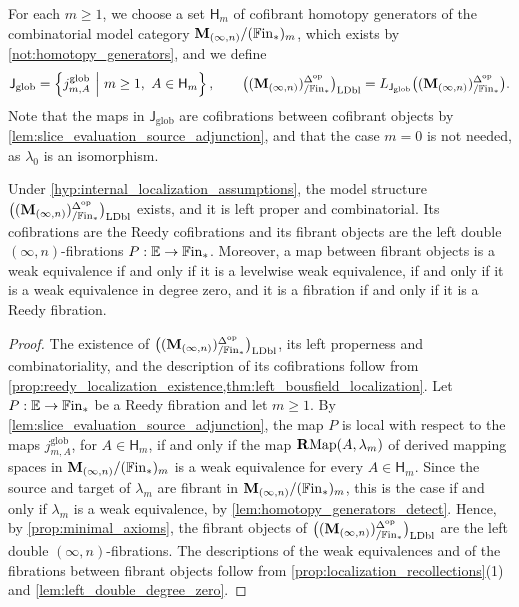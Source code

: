 \documentclass[10pt,reqno]{amsart}
\begin{document}
For each $m\geq1$, we choose a set $\mathsf H_m$ of cofibrant
homotopy generators of the combinatorial model category
$\mathbf M_{(\infty,n)}/(\mathbb{F}\mathrm{in}_*)_m$, which exists by
\cref{not:homotopy_generators}, and we define
\begin{equation}
\label{eq:general_source_localizers}
\mathsf J_{\mathrm{glob}}=
\left\{j^{\mathrm{glob}}_{m,A}\ \middle|\
 m\geq1,\ A\in\mathsf H_m\right\},
\qquad
\bigl((\mathbf M_{(\infty,n)})^{\Delta^{\mathrm{op}}}_{/\mathbb{F}\mathrm{in}_*}\bigr)_{\mathrm{LDbl}}=
L_{\mathsf J_{\mathrm{glob}}}
\bigl((\mathbf M_{(\infty,n)})^{\Delta^{\mathrm{op}}}_{/\mathbb{F}\mathrm{in}_*}\bigr).
\end{equation}
Note that the maps in $\mathsf J_{\mathrm{glob}}$ are cofibrations
between cofibrant objects by
\cref{lem:slice_evaluation_source_adjunction}, and that the case
$m=0$ is not needed, as $\lambda_0$ is an isomorphism.

\begin{theorem}
\label{thm:general_left_double_model_structure}
Under \cref{hyp:internal_localization_assumptions}, the model
structure $\bigl((\mathbf M_{(\infty,n)})^{\Delta^{\mathrm{op}}}_{/\mathbb{F}\mathrm{in}_*}\bigr)_{\mathrm{LDbl}}$ exists, and it is left proper and
combinatorial. Its cofibrations are the Reedy cofibrations and its
fibrant objects are the left double $(\infty,n)$-fibrations
$P:\mathbb E\to\mathbb{F}\mathrm{in}_*$. Moreover, a map between fibrant objects
is a weak equivalence if and only if it is a levelwise weak
equivalence, if and only if it is a weak equivalence in degree zero,
and it is a fibration if and only if it is a Reedy fibration.
\end{theorem}

\begin{proof}
The existence of $\bigl((\mathbf M_{(\infty,n)})^{\Delta^{\mathrm{op}}}_{/\mathbb{F}\mathrm{in}_*}\bigr)_{\mathrm{LDbl}}$, its left properness and
combinatoriality, and the description of its cofibrations follow from
\cref{prop:reedy_localization_existence,thm:left_bousfield_localization}.
Let $P:\mathbb E\to\mathbb{F}\mathrm{in}_*$ be a Reedy fibration and let
$m\geq1$. By \cref{lem:slice_evaluation_source_adjunction}, the map
$P$ is local with respect to the maps $j^{\mathrm{glob}}_{m,A}$,
for $A\in\mathsf H_m$, if and only if the map
$\mathbf{R}\mathrm{Map}(A,\lambda_m)$ of derived mapping spaces in
$\mathbf M_{(\infty,n)}/(\mathbb{F}\mathrm{in}_*)_m$ is a weak equivalence for every
$A\in\mathsf H_m$. Since the source and target of $\lambda_m$ are
fibrant in $\mathbf M_{(\infty,n)}/(\mathbb{F}\mathrm{in}_*)_m$, this is the case if and only if
$\lambda_m$ is a weak equivalence, by
\cref{lem:homotopy_generators_detect}. Hence, by
\cref{prop:minimal_axioms}, the fibrant objects of $\bigl((\mathbf M_{(\infty,n)})^{\Delta^{\mathrm{op}}}_{/\mathbb{F}\mathrm{in}_*}\bigr)_{\mathrm{LDbl}}$ are
the left double $(\infty,n)$-fibrations. The descriptions of the
weak equivalences and of the fibrations between fibrant objects follow
from \cref{prop:localization_recollections}(1) and
\cref{lem:left_double_degree_zero}.
\end{proof}
\end{document}
